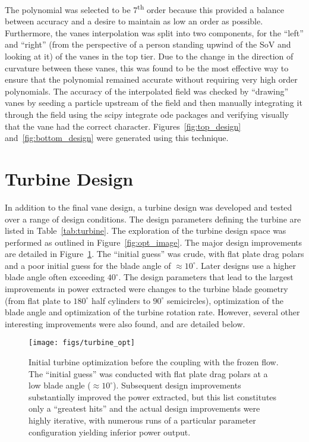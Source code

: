The polynomial was selected to be 7\textsuperscript{th} order because this
provided a balance between accuracy and a desire to maintain as low
an order as possible. Furthermore, the vanes interpolation was split
into two components, for the ``left'' and ``right'' (from the perspective of a
person standing upwind of the SoV and looking at it) of the vanes in the
top tier. Due to the change in the direction of curvature between these vanes, 
this was found to be the most effective way to ensure that the
polynomial remained accurate without requiring very high order
polynomials. The accuracy of the interpolated field was checked by
``drawing'' vanes by seeding a particle upstream of the field and then
manually integrating it through the field using the scipy integrate ode
packages and verifying visually that the vane had the correct
character. Figures~\ref{fig:top_design} and~\ref{fig:bottom_design} were
generated using this technique. 

%
%

\section{Turbine Design}
\label{sec:turb_design}

In addition to the final vane design, a turbine design was developed and
tested over a range of design conditions. The design parameters defining
the turbine are listed in Table~\ref{tab:turbine}. The exploration of the
turbine design space was performed as outlined in
Figure~\ref{fig:opt_image}. The major design improvements are detailed
in Figure~\ref{fig:ut_turbine}. The ``initial guess'' was crude, with
flat plate drag polars and a poor 
initial guess for the blade angle of $\approx 10^{\circ}$. Later
designs use a higher blade angle often exceeding $40^{\circ}$. 
The design parameters that lead to the largest improvements in power
extracted were changes to the turbine blade geometry (from flat plate to
$180^{\circ}$ half cylinders to $90^{\circ}$ semicircles), optimization
of the blade angle and optimization of the turbine rotation rate. 
However, several other interesting improvements were also found, and are
detailed below.  

  \begin{figure}[!htb]
   \begin{center}
    \texttt{[image: figs/turbine\_opt]}
    \caption{Initial turbine optimization before the coupling with the
    frozen flow. The ``initial guess'' was conducted with flat plate
    drag polars at a low blade angle ($\approx
    10^{\circ}$). Subsequent design improvements substantially improved  
    the power extracted, but this list constitutes only a ``greatest
    hits'' and the actual design improvements were highly iterative,
    with numerous runs of a particular parameter configuration yielding
    inferior power output. }
    \label{fig:ut_turbine}
   \end{center}
  \end{figure}

